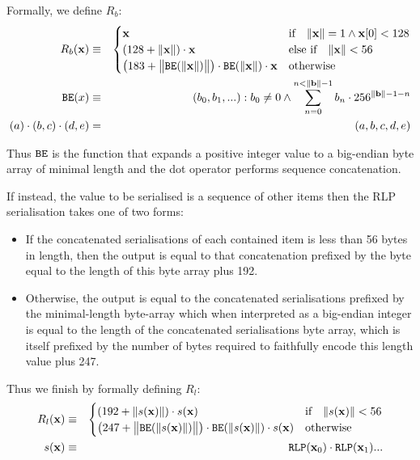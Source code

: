 \documentclass[9pt,oneside]{amsart}
\begin{document}
Formally, we define $R_b$:
\begin{eqnarray}
R_b(\mathbf{x}) & \equiv & \begin{cases}
\mathbf{x} & \text{if} \quad \lVert \mathbf{x} \rVert = 1 \wedge \mathbf{x}[0] < 128 \\
(128 + \lVert \mathbf{x} \rVert) \cdot \mathbf{x} & \text{else if} \quad \lVert \mathbf{x} \rVert < 56 \\
\big(183 + \big\lVert \mathtt{\tiny BE}(\lVert \mathbf{x} \rVert) \big\rVert \big) \cdot \mathtt{\tiny BE}(\lVert \mathbf{x} \rVert) \cdot \mathbf{x} & \text{otherwise}
\end{cases} \\
\mathtt{\tiny BE}(x) & \equiv & (b_0, b_1, ...): b_0 \neq 0 \wedge \sum_{n = 0}^{n < \lVert \mathbf{b} \rVert - 1} b_n \cdot 256^{\lVert \mathbf{b} \rVert - 1 - n} \\
(a) \cdot (b, c) \cdot (d, e) & = & (a, b, c, d, e)
\end{eqnarray}

Thus $\mathtt{\tiny BE}$ is the function that expands a positive integer value to a big-endian byte array of minimal length and the dot operator performs sequence concatenation.

If instead, the value to be serialised is a sequence of other items then the RLP serialisation takes one of two forms:

\begin{itemize}
\item If the concatenated serialisations of each contained item is less than 56 bytes in length, then the output is equal to that concatenation prefixed by the byte equal to the length of this byte array plus 192.
\item Otherwise, the output is equal to the concatenated serialisations prefixed by the minimal-length byte-array which when interpreted as a big-endian integer is equal to the length of the concatenated serialisations byte array, which is itself prefixed by the number of bytes required to faithfully encode this length value plus 247.
\end{itemize}

Thus we finish by formally defining $R_l$:
\begin{eqnarray}
R_l(\mathbf{x}) & \equiv & \begin{cases}
(192 + \lVert s(\mathbf{x}) \rVert) \cdot s(\mathbf{x}) & \text{if} \quad \lVert s(\mathbf{x}) \rVert < 56 \\
\big(247 + \big\lVert \mathtt{\tiny BE}(\lVert s(\mathbf{x}) \rVert) \big\rVert \big) \cdot \mathtt{\tiny BE}(\lVert s(\mathbf{x}) \rVert) \cdot s(\mathbf{x}) & \text{otherwise}
\end{cases} \\
s(\mathbf{x}) & \equiv & \mathtt{\tiny RLP}(\mathbf{x}_0) \cdot \mathtt{\tiny RLP}(\mathbf{x}_1) ...
\end{eqnarray}
\end{document}
